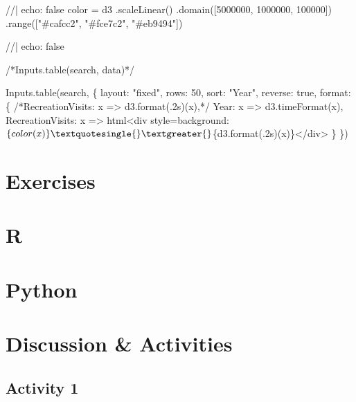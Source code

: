 \documentclass[
  letterpaper,
  DIV=11,
  numbers=noendperiod]{scrartcl}
\newenvironment{Shaded}{\begin{snugshade}}{\end{snugshade}}
\newcommand{\NormalTok}[1]{\textcolor[rgb]{0.00,0.23,0.31}{#1}}
\begin{document}
\begin{Shaded}
\begin{Highlighting}[]
\NormalTok{//| echo: false}
\NormalTok{color = d3}
\NormalTok{  .scaleLinear()}
\NormalTok{  .domain([5000000, 1000000, 100000])}
\NormalTok{  .range(["\#cafcc2", "\#fce7c2", "\#eb9494"])}
\end{Highlighting}
\end{Shaded}

\begin{Shaded}
\begin{Highlighting}[]
\NormalTok{//| echo: false}

\NormalTok{/*Inputs.table(search, data)*/}

\NormalTok{Inputs.table(search, \{}
\NormalTok{  layout: "fixed",}
\NormalTok{  rows: 50,}
\NormalTok{  sort: "Year",}
\NormalTok{  reverse: true,}
\NormalTok{  format: \{}
\NormalTok{    /*RecreationVisits: x =\textgreater{} d3.format(\textquotesingle{}.2s\textquotesingle{})(x),*/}
\NormalTok{    Year: x =\textgreater{} d3.timeFormat(x),}
\NormalTok{    RecreationVisits: x =\textgreater{} html\textasciigrave{}\textless{}div style=\textquotesingle{}background:$\{color(x)\}\textquotesingle{}\textgreater{}$\{d3.format(\textquotesingle{}.2s\textquotesingle{})(x)\}\textless{}/div\textgreater{}\textasciigrave{}}
\NormalTok{  \}}
\NormalTok{\})}
\end{Highlighting}
\end{Shaded}

\section{Exercises}

\section{R}

\label{exercise-posts}

\section{Python}

\section{Discussion \& Activities}

\subsection{Activity 1}\label{exercise-1}
\end{document}
